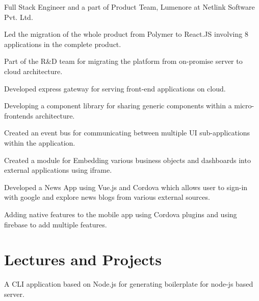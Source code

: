 \documentclass[]{ayush-gupta-resume-openfont}
\begin{document}
\begin{minipage}[t]{0.62\textwidth}
\vspace{\topsep} %
\begin{tightemize}
\item Full Stack Engineer and a part of Product Team, Lumenore at Netlink Software Pvt. Ltd.
\item Led the migration of the whole product from Polymer to React.JS involving 8 applications in the complete product.
\item Part of the R\&D team for migrating the platform from on-promise server to cloud architecture.
\item Developed express gateway for serving front-end applications on cloud.
\item Developing a component library for sharing generic components within a micro-frontends architecture.
\item Created an event bus for communicating between multiple UI sub-applications within the application.
\item Created a module for Embedding various business objects and dashboards into external applications using iframe.
\end{tightemize}
\sectionsep

\begin{tightemize}
\item Developed a News App using Vue.js and Cordova which allows user to sign-in with google and explore news blogs from various external sources.
\item Adding native features to the mobile app using Cordova plugins and using firebase to add multiple features.
\end{tightemize}
\sectionsep


\section{Lectures and Projects}
A CLI application based on Node.js for generating boilerplate for node-js based server. \\
\sectionsep


\end{minipage}
\end{document}
